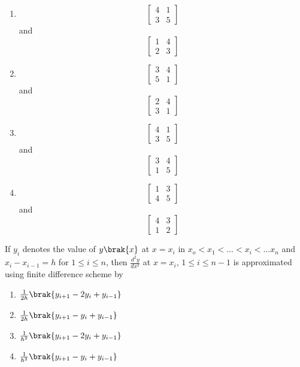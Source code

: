     \begin{enumerate}
        \item \[
\begin{bmatrix}
4 & 1 \\
3 & 5
\end{bmatrix}
\] and \[
\begin{bmatrix}
1 & 4 \\
2 & 3
\end{bmatrix}
\]
     \item \[
\begin{bmatrix}
3 & 4 \\
5 & 1
\end{bmatrix}
\] and \[
\begin{bmatrix}
2 & 4 \\
3 & 1
\end{bmatrix}
\]
\item \[
\begin{bmatrix}
4 & 1 \\
3 & 5
\end{bmatrix}
\] and \[
\begin{bmatrix}
3 & 4 \\
1 & 5
\end{bmatrix}
\]
\item \[
\begin{bmatrix}
1 & 3 \\
4 & 5
\end{bmatrix}
\] and \[
\begin{bmatrix}
4 & 3 \\
1 & 2
\end{bmatrix}
\]
    \end{enumerate}
\item If $y_i$ denotes the value of $y\brak{x}$ at $x=x_i$ in $x_o<x_1<...<x_i<...x_n$ and $x_i-x_{i-1}=h$ for $1\leq i\leq n$, then $\displaystyle\frac{d^2y}{dx^2}$ at $x = x_i$, $1\leq i\leq n-1$ is approximated using finite difference scheme by
\begin{enumerate}
    \item $\frac{1}{2h}\brak{y_{i+1}-2y_i+y_{i-1}}$
    \item $\frac{1}{2h}\brak{y_{i+1}-y_i+y_{i-1}}$
    \item $\frac{1}{h^2}\brak{y_{i+1}-2y_i+y_{i-1}}$
    \item $\frac{1}{h^2}\brak{y_{i+1}-y_i+y_{i-1}}$
\end{enumerate}



